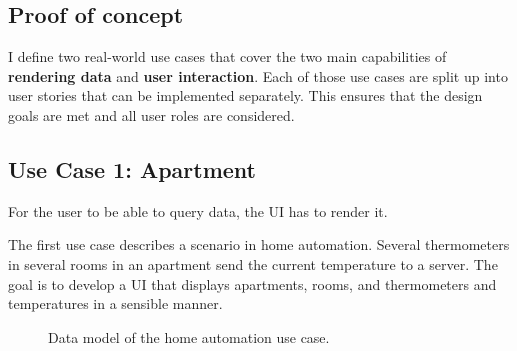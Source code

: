 \subsection{Proof of concept}
I define two real-world use cases that cover the two main capabilities of \textbf{rendering data} and \textbf{user interaction}. Each of those use cases are split up into user stories that can be implemented separately. This ensures that the design goals are met and all user roles are considered.

\subsection{Use Case 1: Apartment}\label{usecases}
For the user to be able to query data, the UI has to render it.

The first use case describes a scenario in home automation. Several thermometers in several rooms in an apartment send the current temperature to a server. The goal is to develop a UI that displays apartments, rooms, and thermometers and temperatures in a sensible manner.

\begin{figure}[!htb]
  \caption{\label{fig:my-label} Data model of the home automation use case.}
\end{figure}


